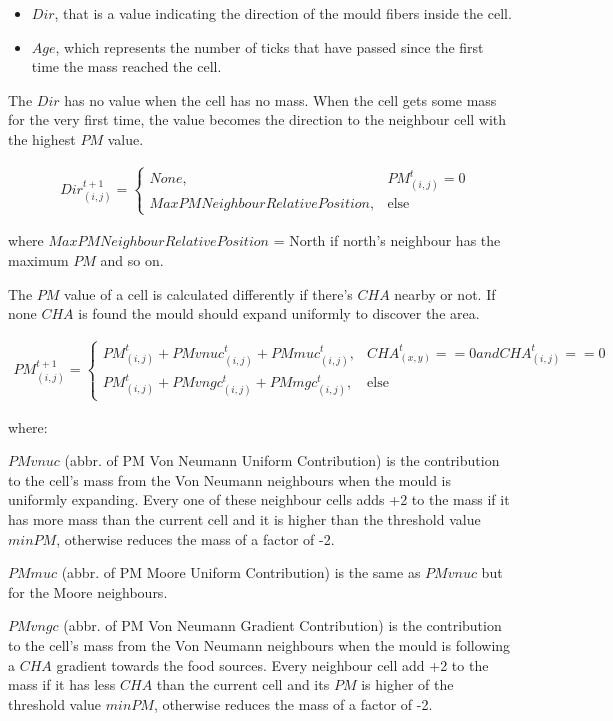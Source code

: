 \begin{itemize}
	\item $Dir$, that is a value indicating the direction of the mould fibers inside the cell.
	\item $Age$, which represents the number of ticks that have passed since the first time the mass reached the cell.
\end{itemize}

The $Dir$ has no value when the cell has no mass. When the cell gets some mass for the very first time, the value becomes the direction to the neighbour cell with the highest $PM$ value.

\begin{align*} &
Dir^{t+1}_{(i, j)}=
\begin{cases} 
None, & PM^t_{(i, j)}= 0 \\ 
MaxPMNeighbourRelativePosition, & \mbox{else}
\end{cases}
\end{align*}


where $MaxPMNeighbourRelativePosition$ = North if north's neighbour has the maximum $PM$ and so on.

\par
The $PM$ value of a cell is calculated differently if there's $CHA$ nearby or not. If none $CHA$ is found the mould should expand uniformly to discover the area.

\begin{align*}
PM^{t+1}_{(i, j)}=
\begin{cases} 
PM^t_{(i, j)} + PMvnuc^t_{(i, j)} + PMmuc^t_{(i, j)},& CHA^t_{(x, y)}==0 and CHA^t_{(i, j)}==0 \\ 
PM^t_{(i, j)}  +PMvngc^t_{(i, j)} + PMmgc^t_{(i, j)}, & \mbox{else}
\end{cases}
\end{align*}

where:

$PMvnuc$ (abbr. of PM Von Neumann Uniform Contribution) is the contribution to the cell's mass from the Von Neumann neighbours when the mould is uniformly expanding. Every one of these neighbour cells adds +2 to the mass if it has more mass than the current cell and it is higher than the threshold value $minPM$, otherwise reduces the mass of a factor of -2.

$PMmuc$ (abbr. of PM Moore Uniform Contribution) is the same as $PMvnuc$ but for the Moore neighbours.

$PMvngc$ (abbr. of PM Von Neumann Gradient Contribution) is the contribution to the cell's mass from the Von Neumann neighbours when the mould is following a $CHA$ gradient towards the food sources. Every neighbour cell add +2 to the mass if it has less $CHA$ than the current cell and its $PM$ is higher of the threshold value $minPM$, otherwise reduces the mass of a factor of -2.

